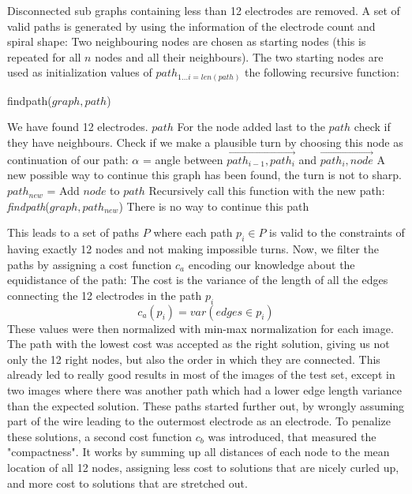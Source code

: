 \documentclass[a4paper, 11pt]{article}
\begin{document}
\begin{enumerate}
Disconnected sub graphs containing less than 12 electrodes are removed.
A set of valid paths is generated by using the information of the electrode count and spiral shape: Two neighbouring nodes are chosen as starting nodes (this is repeated for all $n$ nodes and all their neighbours). The two starting nodes are used as initialization values of $path_{1...i = len(path)} $ the following recursive function:

\begin{algorithm}[H]
	\caption{findpath($graph,path$)} 
	
	\begin{algorithmic}[1]
			 \State We have found 12 electrodes.
		\Return $path$
		\EndIf
		\State For the node added last to the $path$ check if they have neighbours.
				\State Check if we make a plausible turn by choosing this node as continuation of our path:
				\State $\alpha$ = angle between $\overrightarrow{path_{i-1}, path_i}$ and $\overrightarrow{path_i, node}$
					\State A new possible way to continue this graph has been found, the turn is not to sharp.
					\State $path_{new}$ = Add $node$ to $path$
					\State Recursively call this function with the new path:
					\State \emph{findpath}($graph,path_{new}$)
				\EndIf
		\EndFor
			\State There is no way to continue this path
			\Return
		\EndIf
		
	\end{algorithmic} 
\end{algorithm}

This leads to a set of paths $P$ where each path $p_i \in P$ is valid to the constraints of having exactly 12 nodes and not making impossible turns. Now, we filter the paths by assigning a cost function $c_a$ encoding our knowledge about the equidistance of the path: The cost is the variance of the length of all the edges connecting the 12 electrodes in the path $p_i$
$$ c_a(p_i)=var(edges\in p_i)$$
These values were then normalized with min-max normalization for each image. The path with the lowest cost was accepted as the right solution, giving us not only the 12 right nodes, but also the order in which they are connected.
This already led to really good results in most of the images of the test set, except in two images where there was another path which had a lower edge length variance than the expected solution. These paths started further out, by wrongly assuming part of the wire leading to the outermost electrode as an electrode. To penalize these solutions, a second cost function $c_b$ was introduced, that measured the "compactness". It works by summing up all distances of each node to the mean location of all 12 nodes, assigning less cost to solutions that are nicely curled up, and more cost to solutions that are stretched out. 


\end{enumerate}
\end{document}
